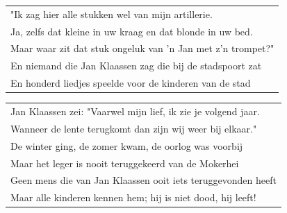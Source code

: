 \documentclass{article}
\begin{document}
\begin{flushleft}
\begin{tabularx}{\textwidth} {
   >{\raggedright\arraybackslash}X}
"Ik zag hier alle stukken wel van mijn artillerie.\\
Ja, zelfs dat kleine in uw kraag en dat blonde in uw bed.\\
Maar waar zit dat stuk ongeluk van ’n Jan met z’n trompet?"\\
En niemand die Jan Klaassen zag die bij de stadspoort zat\\
En honderd liedjes speelde voor de kinderen van de stad\\
\end{tabularx}
\end{flushleft}\begin{flushleft}
\begin{tabularx}{\textwidth} {
   >{\raggedright\arraybackslash}X}
Jan Klaassen zei: "Vaarwel mijn lief, ik zie je volgend jaar.\\
Wanneer de lente terugkomt dan zijn wij weer bij elkaar."\\
De winter ging, de zomer kwam, de oorlog was voorbij\\
Maar het leger is nooit teruggekeerd van de Mokerhei\\
Geen mens die van Jan Klaassen ooit iets teruggevonden heeft\\
Maar alle kinderen kennen hem; hij is niet dood, hij leeft!\\
\end{tabularx}
\end{flushleft}
\end{document}
